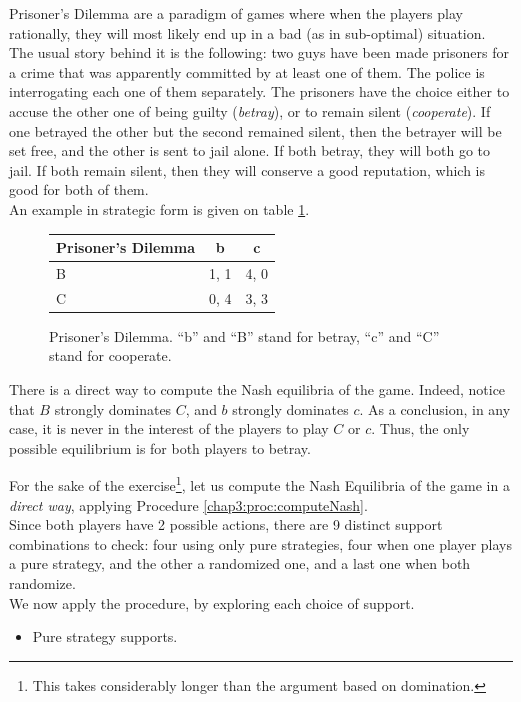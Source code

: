 \begin{example}
Prisoner's Dilemma are a paradigm of games where when the players play rationally, they will most likely end up in a bad (as in sub-optimal) situation.\\
The usual story behind it is the following: two guys have been made prisoners for a crime that was apparently committed by at least one of them. 
The police is interrogating each one of them separately. 
The prisoners have the choice either to accuse the other one of being guilty (\emph{betray}), or to remain silent (\emph{cooperate}).
If one betrayed the other but the second remained silent, then the betrayer will be set free, and the other is sent to jail alone. If both betray, they will both go to jail.
If both remain silent, then they  will conserve a good reputation, which is good for both of them.\\
An example in strategic form is given on table \ref{chap3:pdgame1}. 
\begin{figure}[!ht]
\centering
\begin{tabular}{l|cc}
Prisoner's Dilemma & b & c  \\
\hline
B & 1, 1 & 4, 0 \\
C & 0, 4 & 3, 3 \\
\end{tabular}
\caption{Prisoner's Dilemma. ``b'' and ``B'' stand for betray, ``c'' and ``C'' stand for cooperate. }
\label{chap3:pdgame1}
\end{figure}

There is a direct way to compute the Nash equilibria of the game. Indeed, notice that $B$ strongly dominates $C$, and $b$ strongly dominates $c$. As a conclusion, in any case, it is never in the interest of the players to play $C$ or $c$. Thus, the only possible equilibrium is for both players to betray.


For the sake of the exercise\footnote{This takes considerably longer than the argument based on domination.}, let us compute the Nash Equilibria of the game in a \emph{direct way}, applying Procedure \ref{chap3:proc:computeNash}.\\
Since both players have 2 possible actions, there are 9 distinct support combinations to check:  four using only pure strategies, four when one player plays a pure strategy, and the other a randomized one, and a last one when both randomize.\\
We now apply the procedure, by exploring each choice of support.
\begin{itemize}
\item Pure strategy supports.


\end{itemize}
\end{example}
